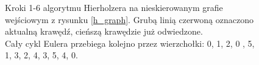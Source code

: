 \documentclass[a4paper, 12pt, twoside, openright]{article}
\begin{document}
\begin{figure}[!p]
		\quad
		\caption[]{Kroki 1-6 algorytmu Hierholzera na nieskierowanym grafie wejściowym z rysunku \ref{h_graph}. Grubą linią czerwoną oznaczono aktualną krawędź, cieńszą krawędzie już odwiedzone.\\Cały cykl Eulera przebiega kolejno przez wierzchołki: 0, 1, 2, 0 , 5, 1, 3, 2, 4, 3, 5, 4, 0.}
		\label{imgHierAlgoEgz1}
	\end{figure}	
	
\end{document}
